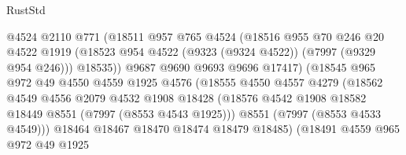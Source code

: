 \begin{lexlean}{RustStd}
\begin{coremodule}
                              @4524
                              @2110
                              @771
                              (@18511
                                @957
                                @765
                                @4524
                                (@18516
                                  @955
                                  @70
                                  @246
                                  @20
                                  @4522
                                  @1919
                                  (@18523
                                    @954
                                    @4522
                                    (@9323 (@9324 @4522))
                                    (@7997 (@9329 @954 @246)))
                                  @18535))
                              @9687
                              @9690
                              @9693
                              @9696
                              @17417)
                            (@18545
                              @965
                              @972
                              @49
                              @4550
                              @4559
                              @1925
                              @4576
                              (@18555
                                @4550
                                @4557
                                @4279
                                (@18562
                                  @4549
                                  @4556
                                  @2079
                                  @4532
                                  @1908
                                  @18428
                                  (@18576
                                    @4542
                                    @1908
                                    @18582
                                    @18449
                                    @8551
                                    (@7997 (@8553 @4543 @1925)))
                                  @8551
                                  (@7997 (@8553 @4533 @4549)))
                                @18464
                                @18467
                                @18470
                                @18474
                                @18479
                                @18485)
                              (@18491
                                @4559
                                @965
                                @972
                                @49
                                @1925

\end{coremodule}
\end{lexlean}
